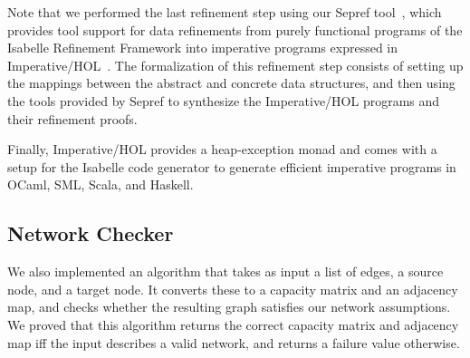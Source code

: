 \documentclass{llncs}
\begin{document}
  Note that we performed the last refinement step using our Sepref tool~\cite{La15}, which provides tool support for data refinements from 
  purely functional programs of the Isabelle Refinement Framework into imperative programs expressed in Imperative/HOL~\cite{BKHEM08}.
  The formalization of this refinement step consists of setting up the mappings between the abstract and concrete data structures,
  and then using the tools provided by Sepref to synthesize the Imperative/HOL programs and their refinement proofs.
  
  Finally, Imperative/HOL provides a heap-exception monad and comes with a setup for the Isabelle code generator to generate efficient imperative programs
  in OCaml, SML, Scala, and Haskell.

  \subsection{Network Checker}
  We also implemented an algorithm that takes as input a list of edges, a source node, and a target node.
  It converts these to a capacity matrix and an adjacency map, and checks whether the resulting graph satisfies our network assumptions.
  We proved that this algorithm returns the correct capacity matrix and adjacency map iff the input describes a valid network,
  and returns a failure value otherwise.
    
\end{document}
